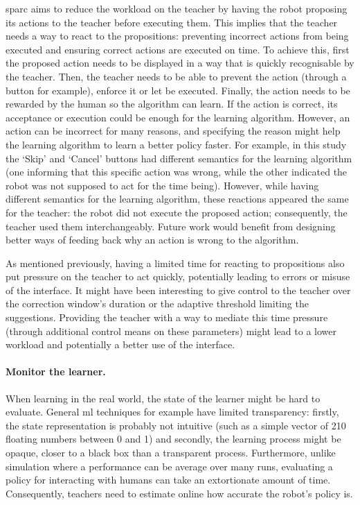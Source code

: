 \gls{sparc} aims to reduce the workload on the teacher by having the robot proposing its actions to the teacher before executing them. This implies that the teacher needs a way to react to the propositions: preventing incorrect actions from being executed and ensuring correct actions are executed on time. To achieve this, first the proposed action needs to be displayed in a way that is quickly recognisable by the teacher. Then, the teacher needs to be able to prevent the action (through a button for example), enforce it or let be executed. Finally, the action needs to be rewarded by the human so the algorithm can learn. If the action is correct, its acceptance or execution could be enough for the learning algorithm. However, an action can be incorrect for many reasons, and specifying the reason might help the learning algorithm to learn a better policy faster. For example, in this study the `Skip' and `Cancel' buttons had different semantics for the learning algorithm (one informing that this specific action was wrong, while the other indicated the robot was not supposed to act for the time being). However, while having different semantics for the learning algorithm, these reactions appeared the same for the teacher: the robot did not execute the proposed action; consequently, the teacher used them interchangeably. Future work would benefit from designing better ways of feeding back why an action is wrong to the algorithm.

As mentioned previously, having a limited time for reacting to propositions also put pressure on the teacher to act quickly, potentially leading to errors or misuse of the interface. It might have been interesting to give control to the teacher over the correction window's duration or the adaptive threshold limiting the suggestions. Providing the teacher with a way to mediate this time pressure (through additional control means on these parameters) might lead to a lower workload and potentially a better use of the interface. 

\paragraph{Monitor the learner.}

When learning in the real world, the state of the learner might be hard to evaluate. General \gls{ml} techniques for example have limited transparency: firstly, the state representation is probably not intuitive (such as a simple vector of 210 floating numbers between 0 and 1) and secondly, the learning process might be opaque, closer to a black box than a transparent process. Furthermore, unlike simulation where a performance can be average over many runs, evaluating a policy for interacting with humans can take an extortionate amount of time. Consequently, teachers need to estimate online how accurate the robot's policy is. 

